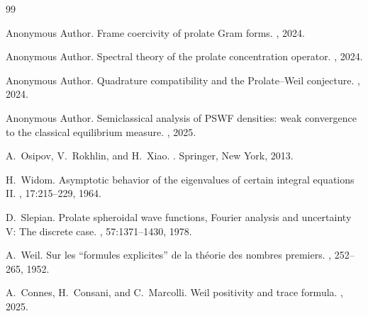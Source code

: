 \documentclass[12pt,a4paper]{amsart}
\theoremstyle{definition}
\begin{document}
\begin{thebibliography}{99}

Anonymous Author.
\newblock Frame coercivity of prolate Gram forms.
, 2024.

Anonymous Author.
\newblock Spectral theory of the prolate concentration operator.
, 2024.

Anonymous Author.
\newblock Quadrature compatibility and the Prolate--Weil conjecture.
,
  2024.

Anonymous Author.
\newblock Semiclassical analysis of PSWF densities: weak convergence to
  the classical equilibrium measure.
, 2025.

A.~Osipov, V.~Rokhlin, and H.~Xiao.
.
\newblock Springer, New York, 2013.

H.~Widom.
\newblock Asymptotic behavior of the eigenvalues of certain integral equations
  II.
, 17:215--229, 1964.

D.~Slepian.
\newblock Prolate spheroidal wave functions, Fourier analysis and uncertainty
  V: The discrete case.
, 57:1371--1430, 1978.

A.~Weil.
\newblock Sur les ``formules explicites'' de la th\'{e}orie des nombres
  premiers.
, 252--265, 1952.

A.~Connes, H.~Consani, and C.~Marcolli.
\newblock Weil positivity and trace formula.
, 2025.

\end{thebibliography}
\end{document}
